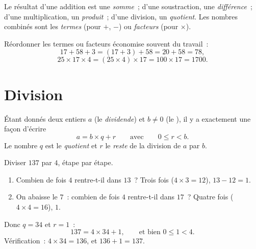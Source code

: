 \begin{remark}[Vocabulaire]
Le résultat d'une addition est une \emph{somme}~; d'une
soustraction, une \emph{différence}~; d'une
multiplication, un \emph{produit}~; d'une division, un
\emph{quotient}. Les nombres combinés sont les
\emph{termes} (pour $+$, $-$) ou \emph{facteurs} (pour $\times$).
\end{remark}

\begin{example}\label{ex:g6:wholes:smart}
Réordonner les termes ou facteurs économise souvent du travail~:
\[
17 + 58 + 3 = (17 + 3) + 58 = 20 + 58 = 78 ,
\]
\[
25 \times 17 \times 4 = (25 \times 4) \times 17 = 100 \times 17 = 1700 .
\]
\end{example}

\section{Division}

\begin{theorem}\label{thm:g6:wholes:division}
Étant donnés deux entiers $a$ (le \emph{dividende}) et $b \neq 0$ (le
\emph{}), il y a exactement une façon d'écrire
\[
a = b \times q + r
\qquad\text{avec}\qquad
0 \leq r < b .
\]
Le nombre $q$ est le \emph{quotient} et $r$ le
\emph{reste} de la division de $a$ par $b$.
\end{theorem}
\admitted

\begin{example}\label{ex:g6:wholes:division}
Diviser $137$ par $4$, étape par étape.
\begin{enumerate}
  \item Combien de fois $4$ rentre-t-il dans $13$~? Trois fois
        ($4 \times 3 = 12$),  $13 - 12 = 1$.
  \item On abaisse le $7$~: combien de fois $4$ rentre-t-il dans
        $17$~? Quatre fois ($4 \times 4 = 16$),  $1$.
\end{enumerate}
Donc $q = 34$ et $r = 1$~:
\[
137 = 4 \times 34 + 1, \qquad\text{et bien } 0 \leq 1 < 4 .
\]
Vérification~: $4 \times 34 = 136$, et $136 + 1 = 137$.
\end{example}

